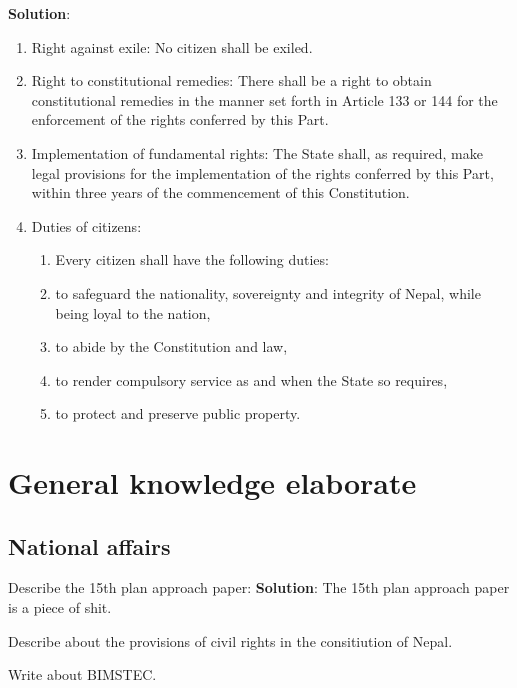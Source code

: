 \documentclass[
]{book}
\newcommand{\question}{\item}
\newenvironment{solution}{ {\bfseries Solution}:}{}
\begin{document}
\begin{questions}
\begin{solution}
\begin{enumerate}
\item Right against exile: No citizen shall be exiled.
\item Right to constitutional remedies: There shall be a right to obtain constitutional remedies in the manner set forth in Article 133 or 144 for the enforcement of the rights conferred by this Part.
\item Implementation of fundamental rights: The State shall, as required, make legal provisions for the implementation of the rights conferred by this Part, within three years of the commencement of this Constitution.
\item Duties of citizens:
\begin{enumerate}
\item[] Every citizen shall have the following duties:
\item to safeguard the nationality, sovereignty and integrity of Nepal, while being loyal to the nation,
\item to abide by the Constitution and law,
\item to render compulsory service as and when the State so requires,
\item to protect and preserve public property.
\end{enumerate}
\end{enumerate}
\end{solution}


\end{questions}

\hypertarget{general-knowledge-elaborate}{%
\chapter{General knowledge elaborate}\label{general-knowledge-elaborate}}

\hypertarget{national-affairs}{%
\section{National affairs}\label{national-affairs}}

\begin{questions}

\question Describe the 15th plan approach paper:
\begin{solution}
The 15th plan approach paper is a piece of shit.
\end{solution}

\question Describe about the provisions of civil rights in the consitiution of Nepal.

\question Write about BIMSTEC.

\end{questions}
\end{document}
